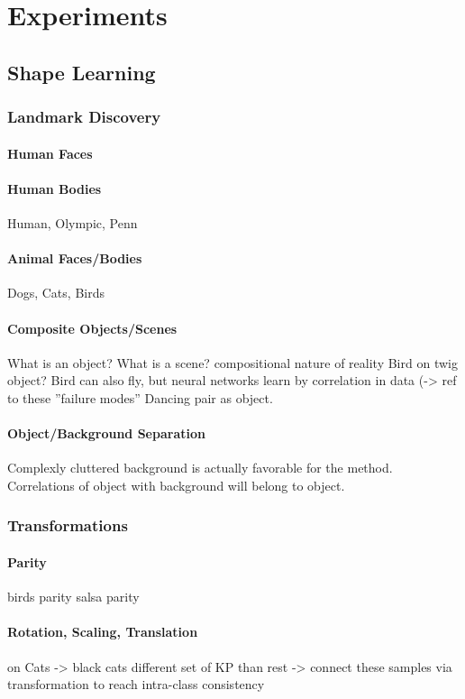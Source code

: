 \chapter{Experiments}

\section{Shape Learning}
	\subsection{Landmark Discovery}
		\subsubsection{Human Faces}
		\subsubsection{Human Bodies}
		Human, Olympic, Penn
		\subsubsection{Animal Faces/Bodies}
		Dogs, Cats, Birds
		\subsubsection{Composite Objects/Scenes}
		What is an object? What is a scene?
		compositional nature of reality
		Bird on twig object? Bird can also fly, but neural networks learn by correlation in data (-> ref to these ''failure modes''
		Dancing pair as object.
		\subsubsection{Object/Background Separation}
			Complexly cluttered background is actually favorable for the method. Correlations of object with background will belong to object.
	\subsection{Transformations}
	\subsubsection{Parity}
	birds parity
	salsa parity
	\subsubsection{Rotation, Scaling, Translation}
		on Cats -> black cats different set of KP than rest -> connect these samples via transformation to reach intra-class consistency
